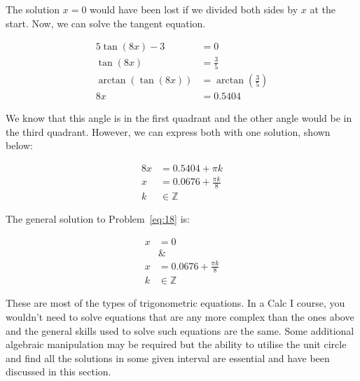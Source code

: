 \documentclass[12pt]{article}
\theoremstyle{definition}
\begin{document}
The solution $x=0$ would have been lost if we divided both sides by $x$ at the start.
Now, we can solve the tangent equation.

\begin{align}
    5\tan(8x)-3       & = 0                               \\
    \tan(8x)          & = \frac{3}{5}                     \\
    \arctan(\tan(8x)) & = \arctan\left(\frac{3}{5}\right) \\
    8x                & = 0.5404
\end{align}

We know that this angle is in the first quadrant and the other angle would be in the third quadrant.
However, we can express both with one solution, shown below:

\begin{align}
    8x & = 0.5404 + \pi k           \\
    x  & = 0.0676 + \frac{\pi k}{8} \\
    k  & \in \mathbb{Z}
\end{align}

The general solution to Problem~\eqref{eq:18} is:

\begin{align}
    x         & = 0                        \\
    \nonumber & \&                         \\
    x         & = 0.0676 + \frac{\pi k}{8} \\
    k         & \in \mathbb{Z}
\end{align}

These are most of the types of trigonometric equations.
In a Calc I course, you wouldn't need to solve equations that are any more complex than the ones above and the general skills used to solve such equations are the same.
Some additional algebraic manipulation may be required but the ability to utilise the unit circle and find all the solutions in some given interval are essential and have been discussed in this section.
\end{document}
